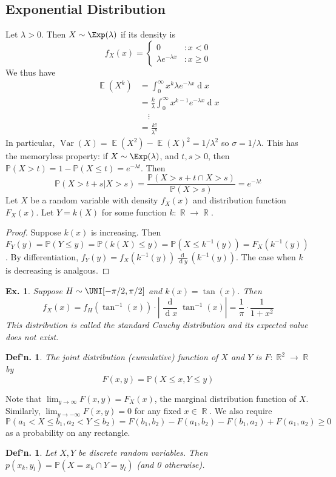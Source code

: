 \documentclass[12pt, a4paper]{book}
\DeclareMathOperator{\R}{\mathbb{R}}
\DeclareMathOperator{\E}{\mathbb{E}}
\DeclareMathOperator{\Var}{Var}
\renewcommand{\Pr}{\mathbb{P}}
\renewcommand{\d}[1]{\ensuremath{\operatorname{d}\!{#1}}} %
\newtheorem{definition}[theorem]{Def'n.}
\newtheorem{example}[theorem]{Ex.}
\theoremstyle{nonumberplain}
\newtheorem{proof}{Proof}
\begin{document}
\subsection{Exponential Distribution}
Let $\lambda>0$.
Then $X\sim\Exp(\lambda)$ if its density is
\[f_X(x)=\begin{cases}0 &:x<0\\\lambda e^{-\lambda x} &: x\geq 0\end{cases}\]
We thus have
\begin{align*}
    \E(X^k) &= \int_0^\infty x^k\lambda e^{-\lambda x}\d{x}\\
            &= \frac{k}{\lambda}\int_0^\infty x^{k-1}e^{-\lambda x}\d{x}\\
            &\quad\vdots\\
            &= \frac{k!}{\lambda^k}
\end{align*}
In particular, $\Var(X)=\E(X^2)-\E(X)^2=1/\lambda^2$ so $\sigma=1/\lambda$.
This has the memoryless property: if $X\sim\Exp(\lambda)$, and $t,s>0$, then $\Pr(X>t)=1-\Pr(X\leq t)=e^{-\lambda t}$.
Then
\[\Pr(X>t+s|X>s) = \frac{\Pr(X>s+t\cap X>s)}{\Pr(X>s)}=e^{-\lambda t}\]
Let $X$ be a random variable with density $f_X(x)$ and distribution function $F_X(x)$.
Let $Y=k(X)$ for some function $k:\R\to\R$.
\begin{proof}
    Suppose $k(x)$ is increasing.
    Then $F_Y(y)=\Pr(Y\leq y)=\Pr(k(X)\leq y)=\Pr(X\leq k^{-1}(y))=F_X(k^{-1}(y))$.
    By differentiation, $f_Y(y)=f_X(k^{-1}(y))\frac{\d{}}{\d{y}}(k^{-1}(y))$.
    The case when $k$ is decreasing is analgous.
\end{proof}
\begin{example}
    Suppose $H\sim\UNI[-\pi/2,\pi/2]$ and $k(x)=\tan(x)$.
    Then
    \[f_X(x)=f_H(\tan^{-1}(x))\cdot\left\lvert\frac{\d{}}{\d{x}}\tan^{-1}(x)\right\rvert=\frac{1}{\pi}\cdot\frac{1}{1+x^2}\]
    This distribution is called the standard Cauchy distribution and its expected value does not exist.
\end{example}
\begin{definition}
    The joint distribution (cumulative) function of $X$ and $Y$ is $F:\R^2\to\R$ by
    \[F(x,y)=\Pr(X\leq x,Y\leq y)\]
\end{definition}
Note that $\lim_{y\to\infty}F(x,y)=F_X(x)$, the marginal distribution function of $X$.
Similarly, $\lim_{y\to-\infty}F(x,y)=0$ for any fixed $x\in\R$.
We also require $\Pr(a_1<X\leq b_1,a_2<Y\leq b_2)=F(b_1,b_2)-F(a_1,b_2)-F(b_1,a_2)+F(a_1,a_2)\geq0$ as a probability on any rectangle.
\begin{definition}
    Let $X,Y$ be discrete random variables.
    Then $p(x_k,y_l)=\Pr(X=x_k\cap Y=y_l)$ (and 0 otherwise).
\end{definition}
\end{document}
